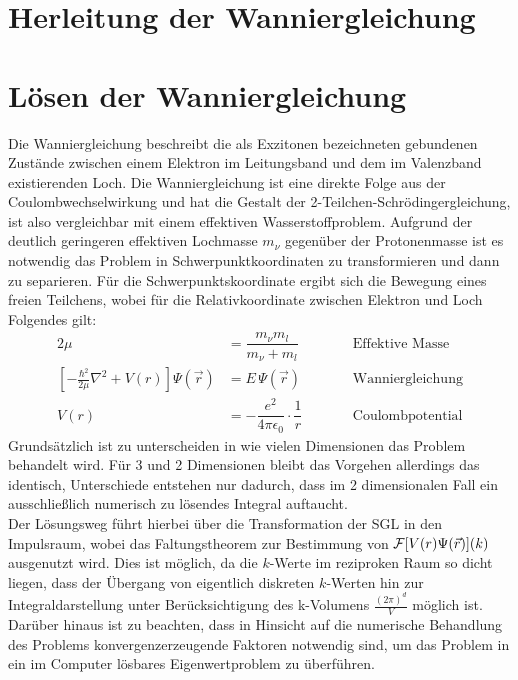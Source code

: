 \section{Herleitung der Wanniergleichung}
\section{Lösen der Wanniergleichung}
Die Wanniergleichung beschreibt die als Exzitonen bezeichneten gebundenen Zustände zwischen einem Elektron im Leitungsband und dem im Valenzband existierenden Loch. Die Wanniergleichung ist eine direkte Folge aus der Coulombwechselwirkung und hat die Gestalt der 2-Teilchen-Schrödingergleichung, ist also vergleichbar mit einem effektiven Wasserstoffproblem. Aufgrund der deutlich geringeren effektiven Lochmasse $m_\nu$ gegenüber der Protonenmasse ist es notwendig das Problem in Schwerpunktkoordinaten zu transformieren und dann zu separieren. Für die Schwerpunktskoordinate ergibt sich die Bewegung eines freien Teilchens, wobei für die Relativkoordinate zwischen Elektron und Loch Folgendes gilt: 
\begin{alignat}{2}
  \mu &=\dfrac{m_\nu m_l}{m_\nu + m_l} && \qquad\text{Effektive Masse}\\
 \left [-\frac{\hbar^2}{2\mu}\nabla ^2 + V(r)\right ]\Psi(\vec{r}) &= E\, \Psi(\vec{r}) && \qquad\text{Wanniergleichung}\\
 V(r)&=-\dfrac{e^2}{4\pi\epsilon_0}\cdot \dfrac{1}{r} &&\qquad \text{Coulombpotential}
\end{alignat}
Grundsätzlich ist zu unterscheiden in wie vielen Dimensionen das Problem behandelt wird. Für 3 und 2 Dimensionen bleibt das Vorgehen allerdings das identisch, Unterschiede entstehen nur dadurch, dass im 2 dimensionalen Fall ein ausschließlich numerisch zu lösendes Integral auftaucht.\\ 
Der Lösungsweg führt hierbei über die Transformation der SGL in den Impulsraum, wobei das Faltungstheorem zur Bestimmung von $\mathcal{F}[V(r)\Psi(\vec{r})](k)$ ausgenutzt wird. Dies ist möglich, da die $k$-Werte im reziproken Raum so dicht liegen, dass der Übergang von eigentlich diskreten $k$-Werten hin zur Integraldarstellung unter Berücksichtigung des k-Volumens $\frac{(2\pi)^d}{V}$ möglich ist. Darüber hinaus ist zu beachten, dass in Hinsicht auf die numerische Behandlung des Problems konvergenzerzeugende Faktoren notwendig sind, um das Problem in ein im Computer lösbares Eigenwertproblem zu überführen. \\ \\

